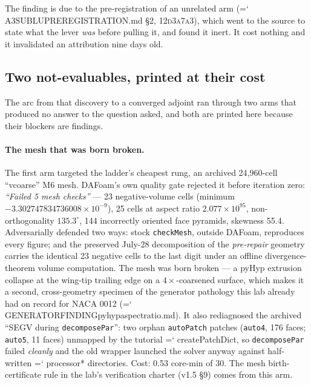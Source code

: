 \documentclass[11pt,a4paper]{article}
\newcommand{\artifact}[1]{{\small\ttfamily\hyphenchar\font=`\-\relax
  \def\_{\textunderscore\allowbreak}#1}}
\newcommand{\commit}[1]{\textsc{\small #1}}
\begin{document}
The finding is due to the pre-registration of an unrelated arm
(\artifact{A3\_SUBLU\_PREREGISTRATION.md} \S2, \commit{12d3a7a3}), which went to the source to
state what the lever \emph{was} before pulling it, and found it inert. It cost nothing and it
invalidated an attribution nine days old.

\subsection{Two not-evaluables, printed at their cost}

The arc from that discovery to a converged adjoint ran through two arms that produced no
answer to the question asked, and both are printed here because their blockers are findings.

\paragraph{The mesh that was born broken.} The first arm targeted the ladder's cheapest rung,
an archived 24{,}960-cell ``vcoarse'' M6 mesh. DAFoam's own quality gate rejected it before
iteration zero: \emph{``Failed 5 mesh checks''} --- 23 negative-volume cells (minimum
\(-3.302747834736008\times10^{-9}\)), 25 cells at aspect ratio \(2.077\times10^{95}\),
non-orthogonality \(135.3^\circ\), 144 incorrectly oriented face pyramids, skewness 55.4.
Adversarially defended two ways: stock \texttt{checkMesh}, outside DAFoam, reproduces every
figure; and the preserved July-28 decomposition of the \emph{pre-repair} geometry carries the
identical 23 negative cells to the last digit under an offline divergence-theorem volume
computation. The mesh was born broken --- a pyHyp extrusion collapse at the wing-tip trailing
edge on a \(4\times\)-coarsened surface, which makes it a second, cross-geometry specimen of
the generator pathology this lab already had on record for NACA 0012
(\artifact{GENERATOR\_FINDING\_pyhyp\_aspect\_ratio.md}). It also rediagnosed the archived
``SEGV during \texttt{decomposePar}'': two orphan \texttt{autoPatch} patches (\texttt{auto4},
176 faces; \texttt{auto5}, 11 faces) unmapped by the tutorial \artifact{createPatchDict}, so
\texttt{decomposePar} failed \emph{cleanly} and the old wrapper launched the solver anyway
against half-written \artifact{processor*} directories. Cost: 0.53 core-min of 30. The mesh
birth-certificate rule in the lab's verification charter (v1.5 \S9) comes from this arm.
\end{document}
